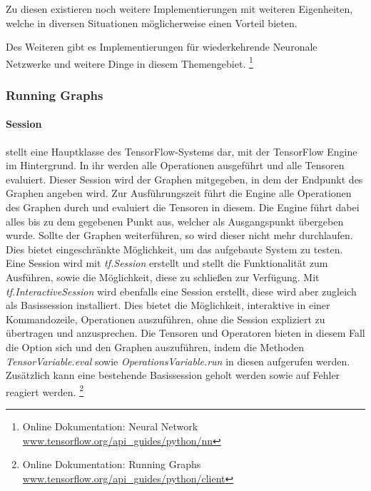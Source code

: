 \noindent
Zu diesen existieren noch weitere Implementierungen mit weiteren Eigenheiten, welche in diversen Situationen möglicherweise einen Vorteil bieten. 
\phantom \newline

\noindent
Des Weiteren gibt es Implementierungen für wiederkehrende Neuronale Netzwerke und weitere Dinge in diesem Themengebiet. 
\footnote{Online Dokumentation: Neural Network \url{www.tensorflow.org/api_guides/python/nn}}

\subsubsection{Running Graphs}

\paragraph{Session} stellt eine Hauptklasse des TensorFlow-Systems dar, mit der TensorFlow Engine im Hintergrund.
In ihr werden alle Operationen ausgeführt und alle Tensoren evaluiert. 
Dieser Session wird der Graphen mitgegeben, in dem der Endpunkt des Graphen angeben wird. 
Zur Ausführungszeit führt die Engine alle Operationen des Graphen durch und evaluiert die Tensoren in diesem. 
Die Engine führt dabei alles bis zu dem gegebenen Punkt aus, welcher als Ausgangspunkt übergeben wurde. 
Sollte der Graphen weiterführen, so wird dieser nicht mehr durchlaufen. 
Dies bietet eingeschränkte Möglichkeit, um das aufgebaute System zu testen. 
Eine Session wird mit \textit{tf.Session} erstellt und stellt die Funktionalität zum Ausführen, sowie die Möglichkeit, diese zu schließen zur Verfügung. 
Mit \textit{tf.InteractiveSession} wird ebenfalls eine Session erstellt, diese wird aber zugleich als Basissession installiert. 
Dies bietet die Möglichkeit, interaktive in einer Kommandozeile, Operationen auszuführen, ohne die Session expliziert zu übertragen und anzusprechen. 
Die Tensoren und Operatoren bieten in diesem Fall die Option sich und den Graphen auszuführen, indem die Methoden \textit{TensorVariable.eval} sowie \textit{OperationsVariable.run} in diesen aufgerufen werden. 
Zusätzlich kann eine bestehende Basissession geholt werden sowie auf Fehler reagiert werden. 
\footnote{Online Dokumentation: Running Graphs \url{www.tensorflow.org/api_guides/python/client}}

